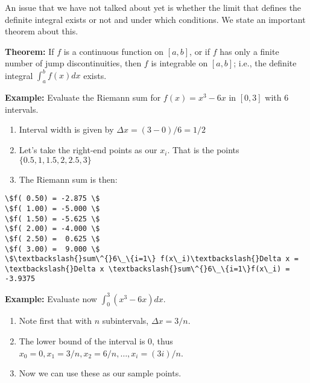 \documentclass[11pt]{article}
\providecommand{\tightlist}{%
      \setlength{\itemsep}{0pt}\setlength{\parskip}{0pt}}
\begin{document}
An issue that we have not talked about yet is whether the limit that
defines the definite integral exists or not and under which conditions.
We state an important theorem about this.

\textbf{Theorem:} If \(f\) is a continuous function on \([a,b]\), or if
\(f\) has only a finite number of jump discontinuities, then \(f\) is
integrable on \([a,b]\); i.e., the definite integral
\(\int^b_a f(x) dx\) exists.

\textbf{Example:} Evaluate the Riemann sum for \(f(x) = x^3 - 6x\) in
\([0,3]\) with \(6\) intervals.

\begin{enumerate}
\def\labelenumi{\arabic{enumi}.}
\tightlist
\item
  Interval width is given by \(\Delta x = (3-0)/ 6 = 1/2\)
\item
  Let's take the right-end points as our \(x_i\). That is the points
  \(\{0.5, 1, 1.5, 2, 2.5, 3\}\)
\item
  The Riemann sum is then:
\end{enumerate}

    \begin{Verbatim}[commandchars=\\\{\}]
\$f( 0.50) = -2.875 \$
\$f( 1.00) = -5.000 \$
\$f( 1.50) = -5.625 \$
\$f( 2.00) = -4.000 \$
\$f( 2.50) =  0.625 \$
\$f( 3.00) =  9.000 \$
\$\textbackslash{}sum\^{}6\_\{i=1\} f(x\_i)\textbackslash{}Delta x = \textbackslash{}Delta x \textbackslash{}sum\^{}6\_\{i=1\}f(x\_i) = -3.9375
\end{Verbatim}

    \textbf{Example:} Evaluate now \(\displaystyle\int^3_0 (x^3-6x) dx\).

\begin{enumerate}
\def\labelenumi{\arabic{enumi}.}
\tightlist
\item
  Note first that with \(n\) subintervals, \(\Delta x = 3/n\).
\item
  The lower bound of the interval is \(0\), thus
  \(x_0 = 0, x_1 = 3/n, x_2 = 6/n,\ldots, x_i = (3i)/n\).
\item
  Now we can use these as our sample points.
\end{enumerate}
\end{document}
